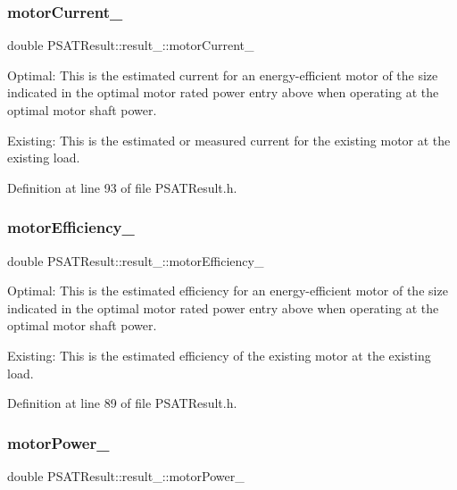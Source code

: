 \subsubsection{\texorpdfstring{motor\+Current\+\_\+}{motorCurrent\_}}
{\footnotesize\ttfamily double P\+S\+A\+T\+Result\+::result\+\_\+\+::motor\+Current\+\_\+}



Optimal\+: This is the estimated current for an energy-\/efficient motor of the size indicated in the optimal motor rated power entry above when operating at the optimal motor shaft power. 

Existing\+: This is the estimated or measured current for the existing motor at the existing load. 

Definition at line 93 of file P\+S\+A\+T\+Result.\+h.

\mbox{\label{struct_p_s_a_t_result_1_1result___a101600986354f5c1884169dc4486db9b}} 
\subsubsection{\texorpdfstring{motor\+Efficiency\+\_\+}{motorEfficiency\_}}
{\footnotesize\ttfamily double P\+S\+A\+T\+Result\+::result\+\_\+\+::motor\+Efficiency\+\_\+}



Optimal\+: This is the estimated efficiency for an energy-\/efficient motor of the size indicated in the optimal motor rated power entry above when operating at the optimal motor shaft power. 

Existing\+: This is the estimated efficiency of the existing motor at the existing load. 

Definition at line 89 of file P\+S\+A\+T\+Result.\+h.

\mbox{\label{struct_p_s_a_t_result_1_1result___ac86aa1d4cf0178d5a74bf3de0c673e8c}} 
\subsubsection{\texorpdfstring{motor\+Power\+\_\+}{motorPower\_}}
{\footnotesize\ttfamily double P\+S\+A\+T\+Result\+::result\+\_\+\+::motor\+Power\+\_\+}



